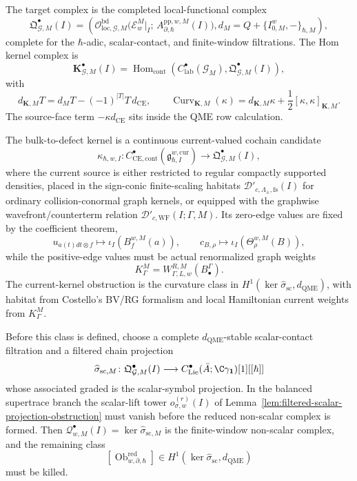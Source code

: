 \begin{enumerate}
  The target complex is the completed local-functional complex
  \[
    \mathfrak Q^\bullet_{\mathcal G,M}(I)
      =
    \left(
      \mathcal O_{\mathrm{loc},\mathcal G,M}^{\mathrm{bd}}\bigl(
        \mathcal E^M_w|_I;\,
        A^{\mathrm{pp},w,M}_{\partial,\hbar}(I)\bigr),
      d_M=Q+\{I^w_{0,M},-\}_{\hbar,M}
    \right),
  \]
  complete for the \(\hbar\)-adic, scalar-contact, and finite-window
  filtrations.  The Hom kernel complex is
  \[
    \mathbf K^\bullet_{\mathcal G,M}(I)
      =
    \operatorname{Hom}_{\mathrm{cont}}\!
    \left(C^\bullet_{\mathrm{lab}}(\mathcal G_M),
      \mathfrak Q^\bullet_{\mathcal G,M}(I)\right),
  \]
  with
  \[
    d_{\mathbf K,M}T
      =
    d_MT-(-1)^{|T|}T\,d_{\mathrm{CE}},
    \qquad
    \operatorname{Curv}_{\mathbf K,M}(\kappa)
      =
    d_{\mathbf K,M}\kappa+\frac12[\kappa,\kappa]_{\mathbf K,M}.
  \]
  The source-face term \(-\kappa d_{\mathrm{CE}}\) sits inside the QME
  row calculation.

  The bulk-to-defect kernel is a continuous current-valued cochain
  candidate
  \[
    \kappa_{\hbar,w,I}\colon
    C^\bullet_{\mathrm{CE},\mathrm{cont}}
    (\mathfrak g^{w,\mathrm{cur}}_{\hbar,I})
      \longrightarrow
    \mathfrak Q^\bullet_{\mathcal G,M}(I),
  \]
  where the current source is either restricted to regular compactly
  supported densities, placed in the sign-conic finite-scaling habitats
  \(\mathcal D'_{c,\Lambda_\pm,\mathrm{fs}}(I)\) for ordinary
  collision-conormal graph kernels, or equipped with the graphwise
  wavefront/counterterm relation
  \(\mathcal D'_{c,\mathrm{WF}}(I;\Gamma,M)\).  Its zero-edge values
  are fixed by the coefficient theorem,
  \[
    u_{a(t)dt\otimes f}\mapsto \iota_I(B^{w,M}_f(a)),
    \qquad
    c_{B,\rho}\mapsto\iota_I(\Theta^{w,M}_\rho(B)),
  \]
  while the positive-edge values must be actual renormalized graph
  weights
  \[
    K^M_\Gamma=W^{R,M}_{\Gamma,L,w}(B^\Gamma_\bullet).
  \]
  The current-kernel obstruction is the curvature class in
  \(H^1(\ker\widehat\sigma_{\mathrm{sc}},d_{\mathrm{QME}})\), with
  habitat from Costello's BV/RG formalism and local Hamiltonian
  current weights from \(K^M_\Gamma\).

  Before this class is defined, choose a complete
  \(d_{\mathrm{QME}}\)-stable scalar-contact filtration and a filtered
  chain projection
  \[
    \widehat\sigma_{\mathrm{sc},M}\colon
    \mathfrak Q^\bullet_{\mathcal G,M}(I)
      \longrightarrow
    C^\bullet_{\mathrm{Lie}}(\bar A;\C\gamma_{\mathbf 1})[1][[\hbar]]
  \]
  whose associated graded is the scalar-symbol projection.  In the
  balanced supertrace branch the scalar-lift tower
  \(o_{\sigma,w}^{(r)}(I)\) of
  Lemma~\ref{lem:filtered-scalar-projection-obstruction} must vanish
  before the reduced non-scalar complex is formed.  Then
  \(\mathcal Q^\bullet_{w,M}(I)=\ker\widehat\sigma_{\mathrm{sc},M}\)
  is the finite-window non-scalar complex, and the remaining class
  \[
    [\operatorname{Ob}^{\mathrm{red}}_{w,\partial,\hbar}]
      \in
    H^1(\ker\widehat\sigma_{\mathrm{sc}},d_{\mathrm{QME}})
  \]
  must be killed.


\end{enumerate}
